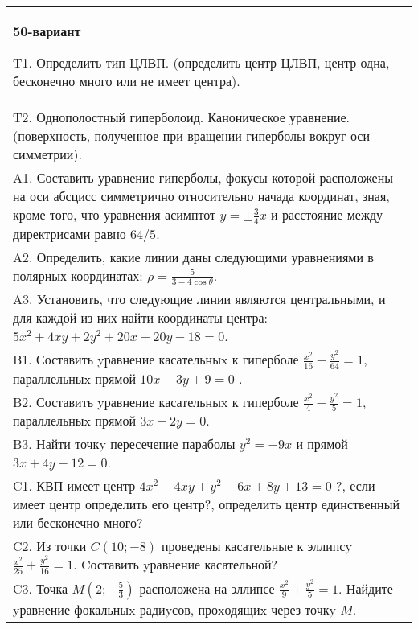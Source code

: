 \documentclass{article}
\begin{document}
\begin{tabular}{m{17cm}}
\textbf{50-вариант}
\newline

T1. Определить тип ЦЛВП. (определить центр ЦЛВП, центр одна, бесконечно много или не имеет центра).\\

T2. Однополостный гиперболоид. Каноническое уравнение. (поверхность, полученное при вращении гиперболы вокруг оси симметрии).\\

A1. Составить уравнение гиперболы, фокусы которой расположены на оси абсцисс симметрично относительно начада координат, зная, кроме того, что уравнения асимптот $y=\pm \frac{3}{4}x$ и расстояние между директрисами равно $64/5$.\\

A2. Определить, какие линии даны следующими уравнениями в полярных координатах: $\rho=\frac{5}{3-4\cos\theta}$.\\

A3. Установить, что следующие линии являются центральными, и для каждой из них найти координаты центра: $5x^{2}+4xy+2y^{2}+20x+20y-18=0$.\\

B1. Составить yравнение касательныx к гиперболе $\frac{x^{2}}{16} - \frac{y^{2}}{64} = 1$, параллельныx прямой $10x - 3y + 9 = 0$ .  \\

B2. Составить yравнение касательныx к гиперболе $\frac{x^{2}}{4} - \frac{y^{2}}{5} = 1$, параллельныx прямой $3x - 2y = 0$.  \\

B3. Найти точкy пересечение параболы $y^{2} = - 9x$ и прямой $3x + 4y - 12 = 0$.  \\

C1. КВП имеет центр $4x^{2}-4xy+y^{2}-6x+8y+13=0$ ?, если имеет центр определить его центр?, определить центр единственный или бесконечно много?  \\

C2. Из точки $C(10;-8)$ проведены касательные к эллипсy $\frac{x^{2}}{25}+\frac{y^{2}}{16}=1$. Cоставить yравнение касательной?  \\

C3. Точка $M(2;-\frac{5}{3})$ расположена на эллипсе $\frac{x^{2}}{9}+\frac{y^{2}}{5}=1$. Найдите yравнение фокальныx радиyсов, проxодящиx через точкy $M$.  \\

\end{tabular}
\vspace{1cm}
\end{document}

